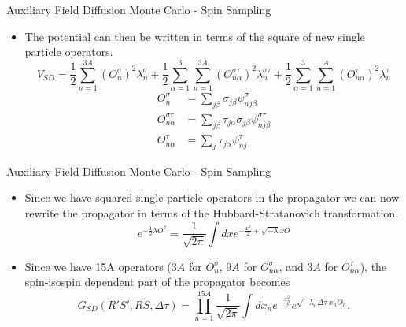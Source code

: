 \documentclass{beamer}
\newcommand{\dt}{\Delta\tau}
\begin{document}
\begin{frame}{Auxiliary Field Diffusion Monte Carlo - Spin Sampling}
\begin{itemize}
   \item The potential can then be written in terms of the square of new single particle operators.
   \begin{equation*}
      V_{SD} = \frac{1}{2}\sum\limits_{n=1}^{3A} \left(O_{n}^{\sigma}\right)^2 \lambda_n^{\sigma}
      + \frac{1}{2}\sum\limits_{\alpha=1}^{3}\sum\limits_{n=1}^{3A} \left(O_{n\alpha}^{\sigma\tau}\right)^2 \lambda_n^{\sigma\tau}
       + \frac{1}{2}\sum\limits_{\alpha=1}^{3}\sum\limits_{n=1}^{A} \left(O_{n\alpha}^{\tau}\right)^2 \lambda_n^{\tau}
   \end{equation*}
   \begin{equation*}
   \begin{split}
      O_{n}^{\sigma} &= \sum\limits_{j\beta} \sigma_{j\beta}\psi_{nj\beta}^{\sigma} \\
      O_{n\alpha}^{\sigma\tau} &= \sum\limits_{j\beta} \tau_{j\alpha}\sigma_{j\beta}\psi_{nj\beta}^{\sigma\tau} \\
      O_{n\alpha}^{\tau} &= \sum\limits_{j} \tau_{j\alpha}\psi_{nj}^{\tau}
   \end{split}
   \end{equation*}
\end{itemize}
\end{frame}

\begin{frame}{Auxiliary Field Diffusion Monte Carlo - Spin Sampling}
\begin{itemize}
   \item Since we have squared single particle operators in the propagator we can now rewrite the propagator in terms of the Hubbard-Stratanovich transformation.
   \begin{equation*}
      e^{-\frac{1}{2}\lambda O^2} = \frac{1}{\sqrt{2\pi}} \int dx e^{-\frac{x^2}{2} + \sqrt{-\lambda}xO}
   \end{equation*}
   \item Since we have 15A operators ($3A$ for $O_{n}^{\sigma}$, $9A$ for $O_{n\alpha}^{\sigma\tau}$, and $3A$ for $O_{n\alpha}^{\tau}$), the spin-isospin dependent part of the propagator becomes
   \begin{equation*}
      G_{SD}(R'S',RS,\dt) = \prod\limits_{n=1}^{15A}\frac{1}{\sqrt{2\pi}}\int dx_n e^{-\frac{x_n^2}{2}}e^{\sqrt{-\lambda_n\dt} x_nO_n}.
   \end{equation*}
\end{itemize}
\end{frame}
\end{document}
